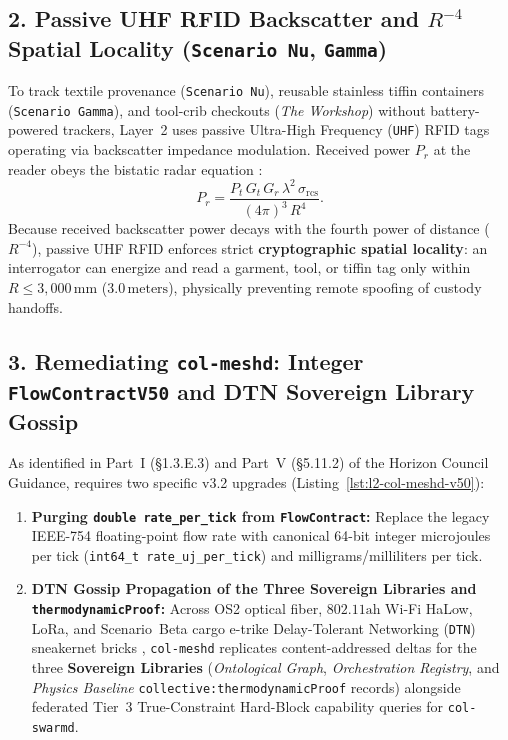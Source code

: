 \subsection{2. Passive UHF RFID Backscatter and $R^{-4}$ Spatial Locality (\texttt{Scenario Nu}, \texttt{Gamma})}

To track textile provenance (\texttt{Scenario Nu}), reusable stainless tiffin containers (\texttt{Scenario Gamma}), and tool-crib checkouts (\textit{The Workshop}) without battery-powered trackers, Layer~2 uses passive Ultra-High Frequency (\texttt{UHF}) RFID tags operating via backscatter impedance modulation. Received power $P_r$ at the reader obeys the bistatic radar equation \parencite{dobkin2012rf}:
\begin{equation}
    P_r = \frac{P_t\, G_t\, G_r\, \lambda^2\, \sigma_{\mathrm{rcs}}}{(4\pi)^3\, R^4}.
    \label{eq:l2-rfid-bistatic}
\end{equation}
Because received backscatter power decays with the fourth power of distance ($R^{-4}$), passive UHF RFID enforces strict \textbf{cryptographic spatial locality}: an interrogator can energize and read a garment, tool, or tiffin tag only within $R \le 3{,}000\,\mathrm{mm}$ ($3.0\,\mathrm{meters}$), physically preventing remote spoofing of custody handoffs.

\subsection{3. Remediating \texttt{col-meshd}: Integer \texttt{FlowContractV50} and DTN Sovereign Library Gossip}

As identified in Part~I (\S1.3.E.3) and Part~V (\S5.11.2) of the Horizon Council Guidance,  requires two specific v3.2 upgrades (Listing~\ref{lst:l2-col-meshd-v50}):
\begin{enumerate}
    \item \textbf{Purging \texttt{double rate\_per\_tick} from \texttt{FlowContract}:} Replace the legacy IEEE-754 floating-point flow rate with canonical 64-bit integer microjoules per tick (\texttt{int64\_t rate\_uj\_per\_tick}) and milligrams/milliliters per tick.
    \item \textbf{DTN Gossip Propagation of the Three Sovereign Libraries and \texttt{thermodynamicProof}:} Across OS2 optical fiber, $802.11\mathrm{ah}$ Wi-Fi HaLow, LoRa, and Scenario~Beta cargo e-trike Delay-Tolerant Networking (\texttt{DTN}) sneakernet bricks \parencite{fall2003,shapiro2011crdt}, \texttt{col-meshd} replicates content-addressed deltas for the three \textbf{Sovereign Libraries} (\textit{Ontological Graph}, \textit{Orchestration Registry}, and \textit{Physics Baseline} \texttt{collective:thermodynamicProof} records) alongside federated Tier~3 True-Constraint Hard-Block capability queries for \texttt{col-swarmd}.
\end{enumerate}

